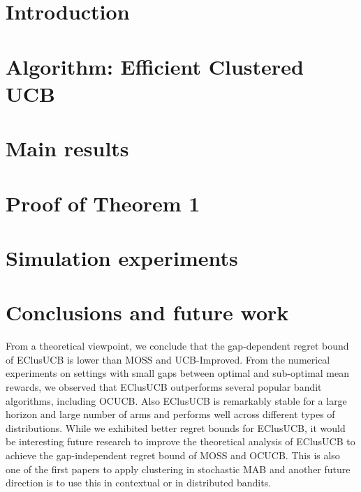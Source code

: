 \documentclass{llncs}
\begin{document}
\section{Introduction}
\label{sec:intro}


\section{Algorithm: Efficient Clustered UCB}
\label{sec:eclusucb}


\section{Main results}
\label{sec:results}


\section{Proof of Theorem 1}
\label{sec:proofTheorem}

%

\section{Simulation experiments}
\label{sec:expts}

%

\section{Conclusions and future work}
\label{sec:conclusions}
From a theoretical viewpoint, we conclude that the gap-dependent regret bound of EClusUCB is lower than MOSS and UCB-Improved. From the numerical experiments on settings with small gaps between optimal and sub-optimal mean rewards, we observed that EClusUCB outperforms several popular bandit algorithms,  including OCUCB. Also EClusUCB is remarkably stable for a large horizon and large number of arms and performs well across different types of distributions. While we exhibited better regret bounds for EClusUCB, it would be interesting future research to improve the theoretical analysis of EClusUCB to achieve the gap-independent regret bound of MOSS and OCUCB. This is also one of the first papers to apply clustering in stochastic MAB and another future direction is to use this in contextual or in distributed bandits. 

\end{document}

